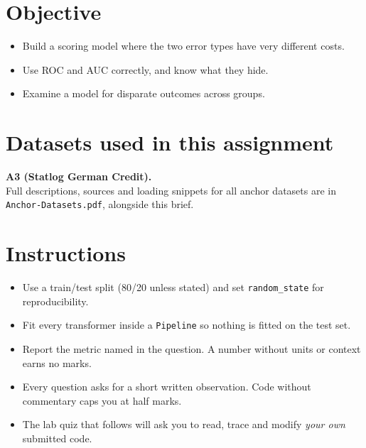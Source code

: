 \documentclass[11pt,a4paper]{article}
\begin{document}

\section*{Objective}

\begin{itemize}[leftmargin=*]

  \item Build a scoring model where the two error types have very different costs.

  \item Use ROC and AUC correctly, and know what they hide.

  \item Examine a model for disparate outcomes across groups.

\end{itemize}

\section*{Datasets used in this assignment}

\textbf{A3 (Statlog German Credit).}\\ Full descriptions, sources and loading snippets for all anchor datasets are in \texttt{Anchor-Datasets.pdf}, alongside this brief.

\section*{Instructions}

\begin{itemize}[leftmargin=*]

  \item Use a train/test split (80/20 unless stated) and set \texttt{random\_state} for reproducibility.

  \item Fit every transformer inside a \texttt{Pipeline} so nothing is fitted on the test set.

  \item Report the metric named in the question. A number without units or context earns no marks.

  \item Every question asks for a short written observation. Code without commentary caps you at half marks.

  \item The lab quiz that follows will ask you to read, trace and modify \emph{your own} submitted code.

\end{itemize}
\end{document}
